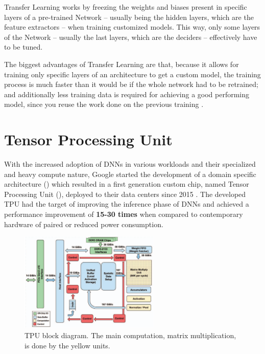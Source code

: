 \documentclass[openright]{normas-utf-tex} %
\begin{document}
Transfer Learning works by freezing the weights and biases present in specific layers of a
pre-trained Network -- usually being the hidden layers, which are the feature extractors -- 
when training customized models. This way,  only some layers of the Network -- usually the last layers, which 
are the deciders -- effectively have to be tuned.

The biggest advantages of Transfer Learning are that, because it allows for
training only specific layers of an architecture to get a custom model, the
training process is much faster than it would be if the whole network had to be
retrained; and additionally less training data is required for achieving a good
performing model, since you reuse the work done on the previous training
\cite{CS231N}.

\section{Tensor Processing Unit}
\label{sec:TPU}

With the increased adoption of DNNs in various workloads and their specialized
and heavy compute nature, Google started the development of a domain specific
architecture () which resulted in a
first generation custom chip, named Tensor Processing Unit (), deployed to their data centers since 2015 \cite{Google2015}.
The developed TPU had the target of improving the inference phase of DNNs and
achieved a performance improvement of \textbf{15-30 times} when compared to
contemporary hardware of paired or reduced power consumption.

\begin{figure}[H]
	\centering
	\includegraphics[width=0.6\textwidth]{./images/tpublock.png}
	\caption[TPU block diagram]{TPU block diagram. The main computation, matrix multiplication, is done by the yellow units.}
	\label{fig:gauge1}
\end{figure}
\end{document}
